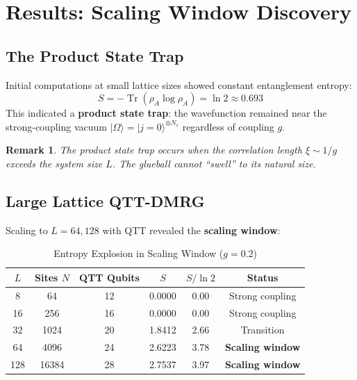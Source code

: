 \documentclass[12pt,a4paper]{article}
\newtheorem{remark}[theorem]{Remark}
\newcommand{\Tr}{\operatorname{Tr}}
\newcommand{\ket}[1]{|#1\rangle}
\begin{document}
\section{Results: Scaling Window Discovery}

\subsection{The Product State Trap}

Initial computations at small lattice sizes showed constant entanglement entropy:
\begin{equation}
    S = -\Tr(\rho_A \log \rho_A) = \ln 2 \approx 0.693
\end{equation}
This indicated a \textbf{product state trap}: the wavefunction remained near the strong-coupling vacuum $\ket{\Omega} = \ket{j=0}^{\otimes N_\ell}$ regardless of coupling $g$.

\begin{remark}
The product state trap occurs when the correlation length $\xi \sim 1/g$ exceeds the system size $L$. The glueball cannot ``swell'' to its natural size.
\end{remark}

\subsection{Large Lattice QTT-DMRG}

Scaling to $L = 64, 128$ with QTT revealed the \textbf{scaling window}:

\begin{table}[h]
\centering
\caption{Entropy Explosion in Scaling Window ($g = 0.2$)}
\label{tab:entropy}
\begin{tabular}{@{}cccccc@{}}
\toprule
$L$ & Sites $N$ & QTT Qubits & $S$ & $S/\ln 2$ & Status \\
\midrule
8 & 64 & 12 & 0.0000 & 0.00 & Strong coupling \\
16 & 256 & 16 & 0.0000 & 0.00 & Strong coupling \\
32 & 1024 & 20 & 1.8412 & 2.66 & Transition \\
64 & 4096 & 24 & 2.6223 & 3.78 & \textbf{Scaling window} \\
128 & 16384 & 28 & 2.7537 & 3.97 & \textbf{Scaling window} \\
\bottomrule
\end{tabular}
\end{table}
\end{document}
